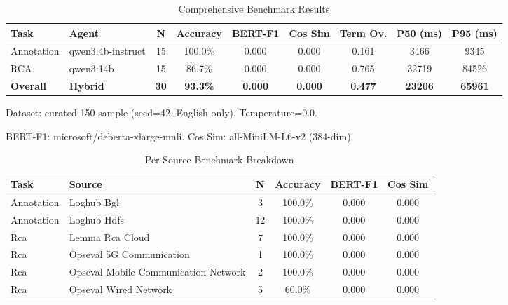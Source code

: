 
\begin{table}[h]
\centering
\caption{Comprehensive Benchmark Results}
\label{tab:comprehensive-results}
\begin{tabular}{llccccccc}
\toprule
\textbf{Task} & \textbf{Agent} & \textbf{N} & \textbf{Accuracy} & \textbf{BERT-F1} & \textbf{Cos Sim} & \textbf{Term Ov.} & \textbf{P50 (ms)} & \textbf{P95 (ms)} \\
\midrule
Annotation & qwen3:4b-instruct & 15 & 100.0\% & 0.000 & 0.000 & 0.161 & 3466 & 9345 \\
RCA & qwen3:14b & 15 & 86.7\% & 0.000 & 0.000 & 0.765 & 32719 & 84526 \\
\midrule
\textbf{Overall} & \textbf{Hybrid} & \textbf{30} & \textbf{93.3\%} & \textbf{0.000} & \textbf{0.000} & \textbf{0.477} & \textbf{23206} & \textbf{65961} \\
\bottomrule
\end{tabular}
\begin{tablenotes}
\small
\item Dataset: curated 150-sample (seed=42, English only). Temperature=0.0.
\item BERT-F1: microsoft/deberta-xlarge-mnli. Cos Sim: all-MiniLM-L6-v2 (384-dim).
\end{tablenotes}
\end{table}


\begin{table}[h]
\centering
\caption{Per-Source Benchmark Breakdown}
\label{tab:per-source}
\begin{tabular}{llcccc}
\toprule
\textbf{Task} & \textbf{Source} & \textbf{N} & \textbf{Accuracy} & \textbf{BERT-F1} & \textbf{Cos Sim} \\
\midrule
Annotation & Loghub Bgl & 3 & 100.0\% & 0.000 & 0.000 \\
Annotation & Loghub Hdfs & 12 & 100.0\% & 0.000 & 0.000 \\
Rca & Lemma Rca Cloud & 7 & 100.0\% & 0.000 & 0.000 \\
Rca & Opseval 5G Communication & 1 & 100.0\% & 0.000 & 0.000 \\
Rca & Opseval Mobile Communication Network & 2 & 100.0\% & 0.000 & 0.000 \\
Rca & Opseval Wired Network & 5 & 60.0\% & 0.000 & 0.000 \\
\bottomrule
\end{tabular}
\end{table}


